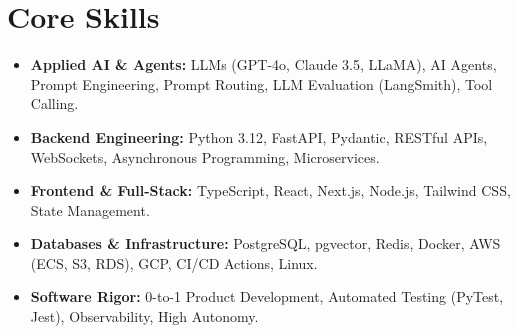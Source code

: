 \documentclass[a4paper,10pt]{article}
\begin{document}
\section{Core Skills}
\begin{itemize}
  \item \textbf{Applied AI \& Agents:} LLMs (GPT-4o, Claude 3.5, LLaMA), AI Agents, Prompt Engineering, Prompt Routing, LLM Evaluation (LangSmith), Tool Calling.
  \item \textbf{Backend Engineering:} Python 3.12, FastAPI, Pydantic, RESTful APIs, WebSockets, Asynchronous Programming, Microservices.
  \item \textbf{Frontend \& Full-Stack:} TypeScript, React, Next.js, Node.js, Tailwind CSS, State Management.
  \item \textbf{Databases \& Infrastructure:} PostgreSQL, pgvector, Redis, Docker, AWS (ECS, S3, RDS), GCP, CI/CD Actions, Linux.
  \item \textbf{Software Rigor:} 0-to-1 Product Development, Automated Testing (PyTest, Jest), Observability, High Autonomy.
\end{itemize}
\end{document}
